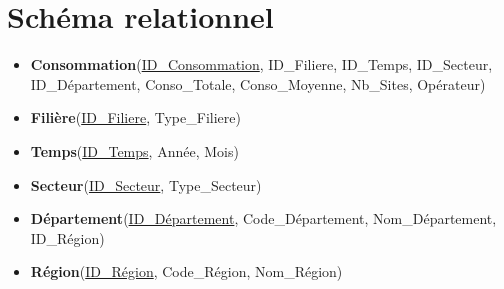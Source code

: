 \documentclass{article}
\begin{document}
\vspace{2cm}

\section*{Schéma relationnel}

\begin{itemize}
    \item \textbf{Consommation}(\underline{ID\_Consommation}, ID\_Filiere, ID\_Temps, ID\_Secteur, ID\_Département, Conso\_Totale, Conso\_Moyenne, Nb\_Sites, Opérateur)
    
    \item \textbf{Filière}(\underline{ID\_Filiere}, Type\_Filiere)
    
    \item \textbf{Temps}(\underline{ID\_Temps}, Année, Mois)
    
    \item \textbf{Secteur}(\underline{ID\_Secteur}, Type\_Secteur)
    
    \item \textbf{Département}(\underline{ID\_Département}, Code\_Département, Nom\_Département, ID\_Région)
    
    \item \textbf{Région}(\underline{ID\_Région}, Code\_Région, Nom\_Région)
\end{itemize}
\end{document}
